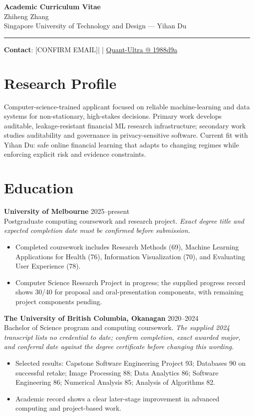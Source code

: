 \documentclass[11pt]{article}
\makeatletter
\newcommand{\ApplicantName}{Zhiheng Zhang}
\newcommand{\ApplicantEmail}{[CONFIRM EMAIL]}
\newcommand{\ApplicantPhone}{[CONFIRM PHONE]}
\newcommand{\ApplicantGitHub}{\href{https://github.com/zhiheng-zhang-Mera/Quant-Ultra/tree/1988d9a8530da91a8158de864d098ea869098923}{Quant-Ultra @ 1988d9a}}
\makeatother
\begin{document}
\begin{center}
{\LARGE\bfseries Academic Curriculum Vitae}\\[0.25em]
{\large \ApplicantName}\\
Singapore University of Technology and Design --- Yihan Du
\end{center}
\vspace{0.35em}\hrule\vspace{0.65em}

\textbf{Contact}: \ApplicantEmail\quad | \quad \ApplicantPhone\quad | \quad \ApplicantGitHub

\section*{Research Profile}
Computer-science-trained applicant focused on reliable machine-learning and data systems for non-stationary, high-stakes decisions. Primary work develops auditable, leakage-resistant financial ML research infrastructure; secondary work studies auditability and governance in privacy-sensitive software. Current fit with Yihan Du: safe online financial learning that adapts to changing regimes while enforcing explicit risk and evidence constraints.

\section*{Education}
\textbf{University of Melbourne} \hfill 2025--present\\
Postgraduate computing coursework and research project. \textit{Exact degree title and expected completion date must be confirmed before submission.}
\begin{itemize}
\item Completed coursework includes Research Methods (69), Machine Learning Applications for Health (76), Information Visualization (70), and Evaluating User Experience (78).
\item Computer Science Research Project in progress; the supplied progress record shows 30/40 for proposal and oral-presentation components, with remaining project components pending.
\end{itemize}

\textbf{The University of British Columbia, Okanagan} \hfill 2020--2024\\
Bachelor of Science program and computing coursework. \textit{The supplied 2024 transcript lists no credential to date; confirm completion, exact awarded major, and conferral date against the degree certificate before changing this wording.}
\begin{itemize}
\item Selected results: Capstone Software Engineering Project 93; Databases 90 on successful retake; Image Processing 88; Data Analytics 86; Software Engineering 86; Numerical Analysis 85; Analysis of Algorithms 82.
\item Academic record shows a clear later-stage improvement in advanced computing and project-based work.
\end{itemize}
\end{document}
